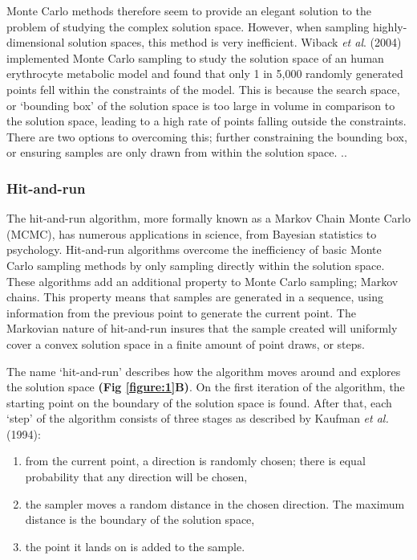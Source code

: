 \documentclass[10pt,letterpaper]{article}
\begin{document}
Monte Carlo methods therefore seem to provide an elegant solution to the problem of studying the complex solution space. However, when sampling highly-dimensional solution spaces, this method is very inefficient. Wiback \textit{et al}. (2004) implemented Monte Carlo sampling to study the solution space of an human erythrocyte metabolic model and found that only 1 in 5,000 randomly generated points fell within the constraints of the model\cite{Wiback}. This is because the search space, or ‘bounding box’ of the solution space is too large in volume in comparison to the solution space, leading to a high rate of points falling outside the constraints. There are two options to overcoming this; further constraining the bounding box, or ensuring samples are only drawn from within the solution space. .. 
 
\subsubsection*{Hit-and-run}
The hit-and-run algorithm, more formally known as a Markov Chain Monte Carlo (MCMC), has numerous applications in science, from Bayesian statistics to psychology\cite{Ravenzwaaij}. Hit-and-run algorithms overcome the inefficiency of basic Monte Carlo sampling methods by only sampling directly within the solution space\cite{Kiatsupaibul}. These algorithms add an additional property to Monte Carlo sampling; Markov chains. This property means that samples are generated in a sequence, using information from the previous point to generate the current point\cite{Ravenzwaaij}. The Markovian nature of hit-and-run insures that the sample created will uniformly cover a convex solution space in a finite amount of point draws, or steps\cite{Ravenzwaaij}.

The name ‘hit-and-run’ describes how the algorithm moves around and explores the solution space \textbf{(Fig \ref{figure:1}B)}. On the first iteration of the algorithm, the starting point on the boundary of the solution space is found. After that, each ‘step’ of the algorithm consists of three stages as described by Kaufman \textit{et al.} (1994):
\begin{enumerate}
\item from the current point, a direction is randomly chosen; there is equal probability that any direction will be chosen,
\item the sampler moves a random distance in the chosen direction. The maximum distance is the boundary of the solution space, 
\item the point it lands on is added to the sample. 
\end{enumerate}
\end{document}

